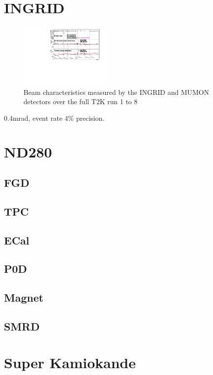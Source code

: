 \section{INGRID}
\label{sec:ingrid}

\begin{figure}[h]
	\includegraphics[width=0.4\textwidth, trim={0mm 0mm 0mm 0mm}, clip,page=1]{figures/det_chap/INGRID_official_plot_until74}
	\caption{Beam characteristics measured by the INGRID and MUMON detectors over the full T2K run 1 to 8}
	\label{fig:ingrid_monitoring}
\end{figure}


\cite{t2k_ingrid}
0.4mrad, event rate 4\% precision.

\section{ND280}

\cite{t2k_det}

\label{sec:nd280}
\cite{t2k_det}

\subsection{FGD}
\cite{t2k_fgd}
\subsection{TPC}
\cite{t2k_tpc}
\subsection{ECal}
\cite{t2k_ecal}
\subsection{P0D}
\cite{t2k_p0d}
\subsection{Magnet}

\subsection{SMRD}
\cite{t2k_smrd}

\section{Super Kamiokande}
\label{sec:sk}
\cite{t2k_sk, t2k_sk2, t2k_sk3}

